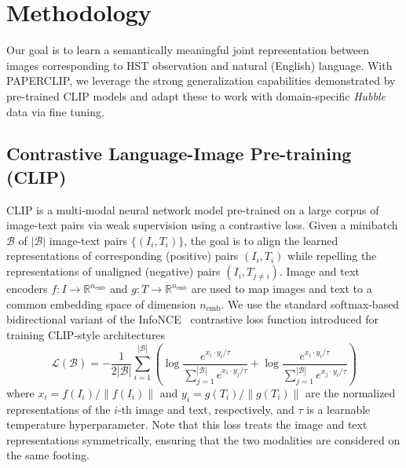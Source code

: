\documentclass[10pt]{article} %
\newcommand{\hubble}{\emph{Hubble}\xspace}
\begin{document}
\section{Methodology}
\label{sec:methodology}

Our goal is to learn a semantically meaningful joint representation between images corresponding to HST observation and natural (English) language.
%
With PAPERCLIP, we leverage the strong generalization capabilities demonstrated by pre-trained CLIP models and adapt these to work with domain-specific \hubble data via fine tuning.

\subsection{Contrastive Language-Image Pre-training (CLIP)}

CLIP \citep[Contrastive Language-Image Pre-training;][]{radford2021learning} is a multi-modal neural network model pre-trained on a large corpus of image-text pairs via weak supervision using a contrastive loss.
%
Given a minibatch $\mathcal{B}$ of $|\mathcal{B}|$ image-text pairs $\{(I_i, T_i)\}$, the goal is to align the learned representations of corresponding (positive) pairs $(I_i, T_i)$ while repelling the representations of unaligned (negative) pairs $(I_i, T_{j\neq i})$.
%
Image and text encoders $f: I \rightarrow \mathbb R^{n_\text{emb}}$ and $g: T \rightarrow \mathbb R^{n_\text{emb}}$ are used to map images and text to a common embedding space of dimension $n_\text{emb}$.
%
We use the standard softmax-based bidirectional variant of the InfoNCE~\citep{oord2018representation} contrastive loss function introduced for training CLIP-style architectures \citep{radford2021learning}
%
\begin{equation}
  \label{eq:softmax_loss}
  \mathcal{L}(\mathcal{B})=-\frac{1}{2|\mathcal{B}|} \sum_{i=1}^{|\mathcal{B}|}\left(\log \frac{e^{x_i \cdot y_i / \tau}}{\sum_{j=1}^{|\mathcal{B}|} e^{x_i \cdot y_j / \tau}}+\log \frac{e^{x_i \cdot y_i / \tau}}{\sum_{j=1}^{|\mathcal{B}|} e^{x_j \cdot y_i / \tau}}\right)
\end{equation}
%
where ${x}_i={f\left(I_i\right)}/{\left\|f\left(I_i\right)\right\|}$ and ${y}_i={g\left(T_i\right)}/{\left\|g\left(T_i\right)\right\|}$ are the normalized representations of the $i$-th image and text, respectively, and $\tau$ is a learnable temperature hyperparameter.
%
Note that this loss treats the image and text representations symmetrically, ensuring that the two modalities are considered on the same footing.
\end{document}
